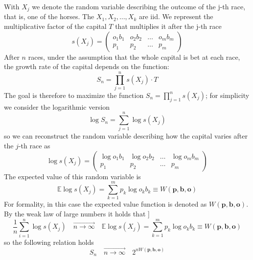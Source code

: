 \documentclass{article}
\begin{document}
With $X_j$ we denote the random variable describing the outcome of the j-th race, that is, one of the horses. The $X_1, X_2, \dots, X_k$ are iid. We represent the multiplicative factor of the capital $T$ that multiplies it after the j-th race
\begin{equation}
s(X_j) = 
    \begin{pmatrix}
    o_1b_1 & o_2b_2 & \dots & o_mb_m \\
    p_1 & p_2 & \dots & p_m
\end{pmatrix}
\end{equation}
After $n$ races, under the assumption that the whole capital is bet at each race, the growth rate of the capital depends on the function:
\begin{equation}
    S_n = \prod_{j = 1}^{n}s(X_j)\cdot T
\end{equation}
The goal is therefore to maximize the function $S_n = \prod_{j = 1}^{n}s(X_j)$; for simplicity we consider the logarithmic version
\begin{equation}
    \log S_n = \sum_{j = 1}^{n}\log s(X_j)
\end{equation}
so we can reconstruct the random variable describing how the capital varies after the $j$-th race as
\begin{equation}
\log s(X_j) = 
    \begin{pmatrix}
    \log o_1b_1 & \log o_2b_2 & \dots & \log o_mb_m \\
    p_1 & p_2 & \dots & p_m
\end{pmatrix}
\end{equation}
The expected value of this random variable is
\begin{equation}
    \mathbb{E}\log s(X_j) = \sum_{k=1}^{m}p_k\log o_k b_k \equiv W(\mathbf{p}, \mathbf{b}, \mathbf{o})
\end{equation}
For formality, in this case the expected value function is denoted as $W(\mathbf{p}, \mathbf{b}, \mathbf{o})$. \\
By the weak law of large numbers it holds that 
]\begin{equation}
    \dfrac{1}{n}\sum_{i = 1}^{n} \log s(X_j)\quad \overrightarrow{n\rightarrow \infty}\quad \mathbb{E}\log s(X_j) = \sum_{k=1}^{m}p_k\log o_k b_k \equiv W(\mathbf{p}, \mathbf{b}, \mathbf{o})
\end{equation}
so the following relation holds
\begin{equation}
    S_n \quad \overrightarrow{n\rightarrow \infty}\quad 2^{nW(\mathbf{p}, \mathbf{b}, \mathbf{o})}
\end{equation}
\end{document}
